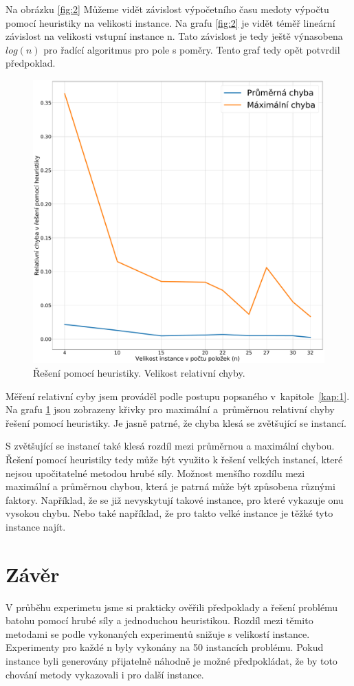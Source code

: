 \documentclass[11pt]{article}
\begin{document}
Na obrázku \ref{fig:2} Můžeme vidět závislost výpočetního času medoty výpočtu pomocí heuristiky na velikosti instance. Na grafu \ref{fig:2} je vidět  téměř lineární závislost na velikosti vstupní instance n. Tato závislost je tedy ještě výnasobena $log(n)$ pro řadící algoritmus pro pole s poměry. Tento graf tedy opět potvrdil předpoklad.
\begin{figure}\centering
	\includegraphics[scale=0.25]{img/3}
 	\caption[3]{Řešení pomocí heuristiky. Velikost relativní chyby.}\label{fig:3}
 \end{figure} 	
Měření relativní cyby jsem prováděl podle postupu popsaného v~kapitole~\ref{kap:1}. Na grafu \ref{fig:3} jsou zobrazeny křivky pro maximální a~průměrnou relativní chyby řešení pomocí heuristiky. Je jasně patrné, že chyba klesá se zvětšující se instancí. 

S zvětšující se instancí také klesá rozdíl mezi průměrnou a maximální chybou. Řešení pomocí heuristiky tedy může být využito k řešení velkých instancí, které nejsou upočitatelné metodou hrubé síly. Možnost menšího rozdílu mezi maximální a průměrnou chybou, která je patrná může být způsobena různými faktory. Například, že se již nevyskytují takové instance, pro které vykazuje onu vysokou chybu. Nebo také například, že pro takto velké instance je těžké tyto instance najít. 

 
\section{Závěr}
V průběhu experimetu jsme si prakticky ověřili předpoklady a řešení problému batohu pomocí hrubé síly a jednoduchou heuristikou. Rozdíl mezi těmito metodami se podle vykonaných experimentů snižuje s velikostí instance. Experimenty pro každé n byly vykonány na 50 instancích problému. Pokud instance byli generovány přijatelně náhodně je možné předpokládat, že by toto chování metody vykazovali i pro další instance. 
\end{document}
